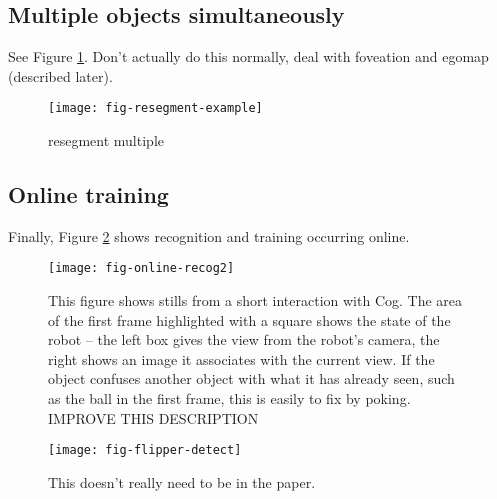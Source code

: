 \subsection{Multiple objects simultaneously}

See Figure \ref{fig:resegment-multiple}.
Don't actually do this normally, deal with foveation
and egomap (described later).


\begin{figure}[tb]
\centerline{\texttt{[image: fig-resegment-example]}}
\caption[Hands-free segmentation]{ 
%
resegment multiple
%
}
\label{fig:resegment-multiple}
\end{figure}




\subsection{Online training}

Finally, Figure \ref{fig:resegment-online} shows recognition
and training occurring online.



\begin{figure}[tbh]
\centerline{\texttt{[image: fig-online-recog2]}}
\caption[Another example]{ 
%
This figure shows stills from a short interaction with Cog.
The area of the first frame highlighted with a square shows the state
of the robot -- the left box gives the view from the robot's camera,
the right shows an image it associates with the current view.
If the object confuses another object with what it has already seen,
such as the ball in the first frame, this is easily to fix
by poking.  IMPROVE THIS DESCRIPTION
%
}
\label{fig:resegment-online}
\end{figure}


\begin{figure}[tb]
\begin{center}
\texttt{[image: fig-flipper-detect]}
\caption{ 
\label{fig:flipper-detect}
%
This doesn't really need to be in the paper.
%
}
\end{center}
\end{figure}

